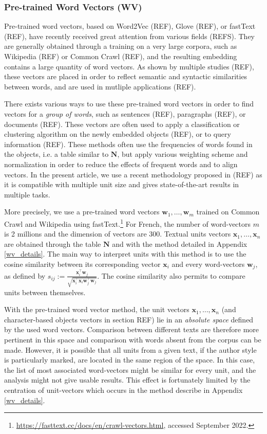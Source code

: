 \documentclass[
twocolumn,
]{ceurart}
\begin{document}
\subsubsection{Pre-trained Word Vectors (WV)}
\label{wv_method}

Pre-trained word vectors, based on Word2Vec (REF), Glove (REF), or fastText (REF), have recently received great attention from various fields (REFS). They are generally obtained through a training on a very large corpora, such as Wikipedia (REF) or Common Crawl (REF), and the resulting embedding contains a large quantity of word vectors. As shown by multiple studies (REF), these vectors are placed in order to reflect semantic and syntactic similarities between words, and are used in mutliple applications (REF). 

There exists various ways to use these pre-trained word vectors in order to find vectors for a \emph{group of words}, such as sentences (REF), paragraphs (REF), or documents (REF). These vectors are often used to apply a classification or clustering algorithm on the newly embedded objects (REF), or to query information (REF). These methods often use the frequencies of words found in the objects, i.e. a table similar to $\mathbf{N}$, but apply various weighting scheme and normalization in order to reduce the effects of frequent words and to align vectors. In the present article, we use a recent methodology proposed in (REF) as it is compatible with multiple unit size and gives state-of-the-art results in multiple tasks. 

More precisely, we use a pre-trained word vectors $\mathbf{w}_1, \ldots, \mathbf{w}_m$ trained on Common Crawl and Wikipedia using fastText.\footnote{\url{ https://fasttext.cc/docs/en/crawl-vectors.html}, accessed September 2022.} For French, the number of word-vectors $m$ is 2 millions and the dimension of vectors are $300$. Textual units vectors $\mathbf{x}_1, \ldots, \mathbf{x}_n$ are obtained through the table $\mathbf{N}$ and with the method detailed in Appendix \ref{wv_details}. The main way to interpret units with this method is to use the cosine similarity between its corresponding vector $\mathbf{x}_i$ and every word-vectors $\mathbf{w}_j$, as defined by $s_{ij} := \frac{\mathbf{x}_i^\top \mathbf{w}_j}{\sqrt{\mathbf{x}_i^\top \mathbf{x}_i \mathbf{w}_j^\top \mathbf{w}_j}}$. The cosine similarity also permits to compare units between themselves.

With the pre-trained word vector method, the unit vectors $\mathbf{x}_1, \ldots, \mathbf{x}_n$ (and character-based objects vectors in section REF) lie in an \emph{absolute space} defined by the used word vectors. Comparison between different texts are therefore more pertinent in this space and comparison with words absent from the corpus can be made. However, it is possible that all units from a given text, if the author style is particularly marked, are located in the same region of the space. In this case, the list of most associated word-vectors might be similar for every unit, and the analysis might not give usable results. This effect is fortunately limited by the centration of unit-vectors which occurs in the method describe in Appendix \ref{wv_details}.
\end{document}
